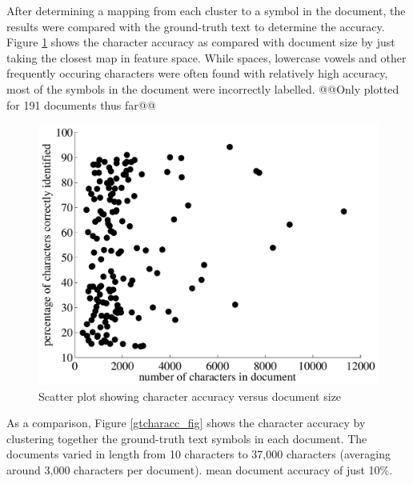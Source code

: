 \documentclass[times, 10pt,twocolumn]{article}
\begin{document}
After determining a mapping from each cluster to a symbol in the document, the
results were compared with the ground-truth text to determine the accuracy.
Figure \ref{characc_fig} shows the character accuracy as compared with document
size by just taking the closest map in feature space.  While spaces, lowercase
vowels and other frequently occuring characters were often found with
relatively high accuracy, most of the symbols in the document were incorrectly
labelled.  @@Only plotted for 191 documents thus far@@

\begin{figure}[ht]
  \centering
  \includegraphics[scale=.4]{figures/character_accuracy}
  \caption{Scatter plot showing character accuracy versus document size}
  \label{characc_fig}
\end{figure}

As a comparison, Figure \ref{gtcharacc_fig} shows the character accuracy by
clustering together the ground-truth text symbols in each document.  The
documents varied in length from 10 characters to 37,000 characters (averaging
around 3,000 characters per document).  
mean document accuracy of just 10\%.
\end{document}
